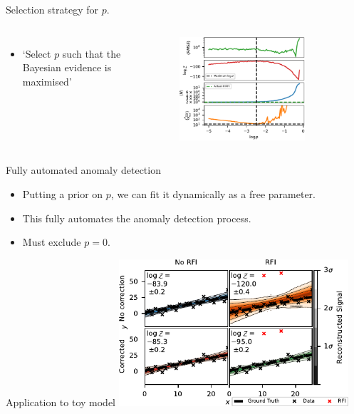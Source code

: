 \documentclass[aspectratio=169]{beamer}
\begin{document}
\begin{frame}{Selection strategy for $p$.}
  \begin{columns}
    \begin{itemize}
      \item `Select $p$ such that the Bayesian evidence is maximised'
    \end{itemize}
    \begin{figure}
      \includegraphics[width=0.8\textwidth]{images/f_approx_current_sig5_2.pdf}
    \end{figure}
  \end{columns}
\end{frame}

\begin{frame}{Fully automated anomaly detection}
  \begin{itemize}
  \item Putting a prior on $p$, we can fit it dynamically as a free parameter.
  \item This fully automates the anomaly detection process.
  \item Must exclude $p=0$.
  \end{itemize}
\end{frame}

\begin{frame}{Application to toy model}
  \centering
  \includegraphics[width=0.64\textwidth]{images/4pane_toy_sidebar.pdf}
\end{frame}
\end{document}
